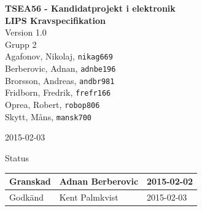 \documentclass[11pt]{article}
\date{}
\begin{document}
\begin{titlepage}
\begin{center}
{\Large\bfseries TSEA56 - Kandidatprojekt i elektronik \\ LIPS Kravspecifikation}\\
%
\vspace{2\baselineskip}
%
Version 1.0\\
\vspace{2\baselineskip}
%
Grupp 2 \\
Agafonov, Nikolaj, 
\texttt{nikag669}
\\
Berberovic, Adnan, 
\texttt{adnbe196}
\\
Brorsson, Andreas, 
\texttt{andbr981}
\\
Fridborn, Fredrik, 
\texttt{frefr166}
\\
Oprea, Robert, 
\texttt{robop806}
\\
Skytt, Måns, 
\texttt{mansk700}

\vspace{2\baselineskip}
2015-02-03

\vspace{25\baselineskip}
Status
\begin{longtable}{|l|l|l|} \hline

Granskad &
Adnan Berberovic &
2015-02-02 \\ \hline
Godkänd &
Kent Palmkvist &
2015-02-03 \\ \hline
 
\end{longtable}

\end{center}
\end{titlepage}
\end{document}
